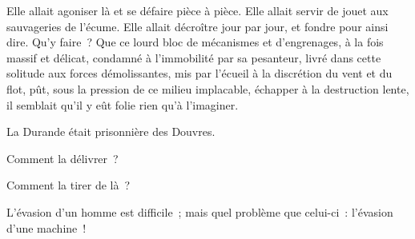 \documentclass[french,twoside]{book} %
\begin{document}
Elle allait agoniser là et se défaire pièce à pièce. Elle allait servir de jouet aux sauvageries de l’écume. Elle allait décroître jour par jour, et fondre pour ainsi dire. Qu’y faire ? Que ce lourd bloc de mécanismes et  d’engrenages, à la fois massif et délicat, condamné à l’immobilité par sa pesanteur, livré dans cette solitude aux forces démolissantes, mis par l’écueil à la discrétion du vent et du flot, pût, sous la pression de ce milieu implacable, échapper à la destruction lente, il semblait qu’il y eût folie rien qu’à l’imaginer.\par
La Durande était prisonnière des Douvres.\par
Comment la délivrer ?\par
Comment la tirer de là ?\par
L’évasion d’un homme est difficile ; mais quel problème que celui-ci : l’évasion d’une machine !
\end{document}
